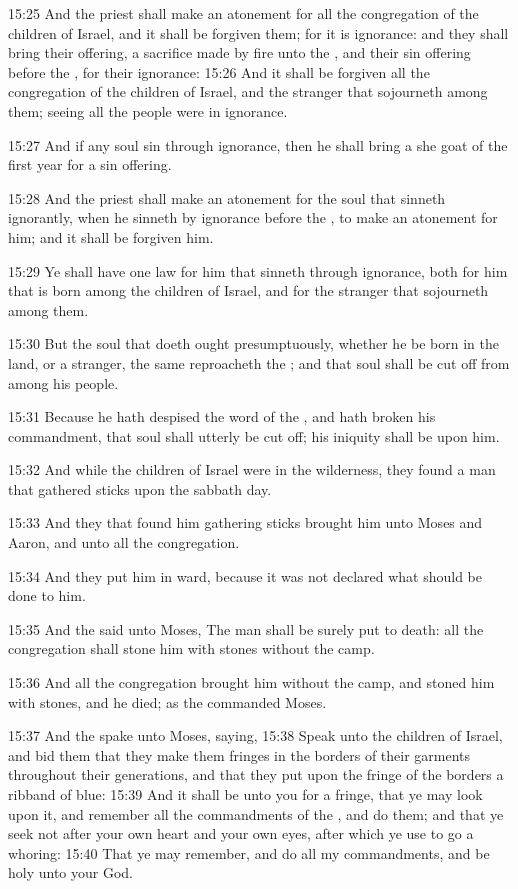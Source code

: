 15:25 And the priest shall make an atonement for all the congregation of the children of Israel, and it shall be forgiven them; for it is ignorance: and they shall bring their offering, a sacrifice made by fire unto the \LORD, and their sin offering before the \LORD, for their ignorance: 15:26 And it shall be forgiven all the congregation of the children of Israel, and the stranger that sojourneth among them; seeing all the people were in ignorance.

15:27 And if any soul sin through ignorance, then he shall bring a she goat of the first year for a sin offering.

15:28 And the priest shall make an atonement for the soul that sinneth ignorantly, when he sinneth by ignorance before the \LORD, to make an atonement for him; and it shall be forgiven him.

15:29 Ye shall have one law for him that sinneth through ignorance, both for him that is born among the children of Israel, and for the stranger that sojourneth among them.

15:30 But the soul that doeth ought presumptuously, whether he be born in the land, or a stranger, the same reproacheth the \LORD; and that soul shall be cut off from among his people.

15:31 Because he hath despised the word of the \LORD, and hath broken his commandment, that soul shall utterly be cut off; his iniquity shall be upon him.

15:32 And while the children of Israel were in the wilderness, they found a man that gathered sticks upon the sabbath day.

15:33 And they that found him gathering sticks brought him unto Moses and Aaron, and unto all the congregation.

15:34 And they put him in ward, because it was not declared what should be done to him.

15:35 And the \LORD said unto Moses, The man shall be surely put to death: all the congregation shall stone him with stones without the camp.

15:36 And all the congregation brought him without the camp, and stoned him with stones, and he died; as the \LORD commanded Moses.

15:37 And the \LORD spake unto Moses, saying, 15:38 Speak unto the children of Israel, and bid them that they make them fringes in the borders of their garments throughout their generations, and that they put upon the fringe of the borders a ribband of blue: 15:39 And it shall be unto you for a fringe, that ye may look upon it, and remember all the commandments of the \LORD, and do them; and that ye seek not after your own heart and your own eyes, after which ye use to go a whoring: 15:40 That ye may remember, and do all my commandments, and be holy unto your God.

